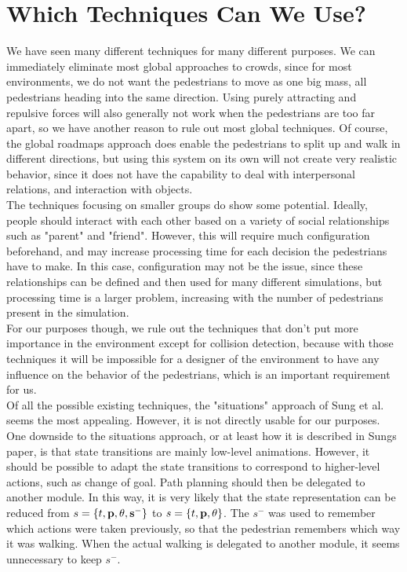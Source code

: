 \documentclass[11pt, a4paper]{book}
\begin{document}
\section{Which Techniques Can We Use?}
We have seen many different techniques for many different purposes. We can immediately eliminate most global approaches to  crowds, since for most environments, we do not want the pedestrians to move as one big mass, all pedestrians heading into the same direction. Using purely attracting and repulsive forces will also generally not work when the pedestrians are too far apart, so we have another reason to rule out most global techniques. Of course, the global roadmaps approach does enable the pedestrians to split up and walk in different directions, but using this system on its own will not create very realistic behavior, since it does not have the capability to deal with interpersonal relations, and interaction with objects.\\
The techniques focusing on smaller groups do show some potential. Ideally, people should interact with each other based on a variety of social relationships such as "parent" and "friend". However, this will require much configuration beforehand, and may increase processing time for each decision the pedestrians have to make. In this case, configuration may not be the issue, since these relationships can be defined and then used for many different simulations, but processing time is a larger problem, increasing with the number of pedestrians present in the simulation.\\
For our purposes though, we rule out the techniques that don't put more importance in the environment except for collision detection, because with those techniques it will be impossible for a designer of the environment to have any influence on the behavior of the pedestrians, which is an important requirement for us.\\
Of all the possible existing techniques, the "situations" approach of Sung et al. seems the most appealing. 
However, it is not directly usable for our purposes. One downside to the situations approach, or at least how it is described in Sungs paper, is that state transitions are mainly low-level animations. However, it should be possible to adapt the state transitions to correspond to higher-level actions, such as change of goal. Path planning should then be delegated to another module. In this way, it is very likely that the state representation can be reduced from $s = \{t, \bf{p}, \theta, s^- \}$ to $s = \{t, \bf{p}, \theta\}$. The $s^-$ was used to remember which actions were taken previously, so that the pedestrian remembers which way it was walking. When the actual walking is delegated to another module, it seems unnecessary to keep $s^-$.
\end{document}
